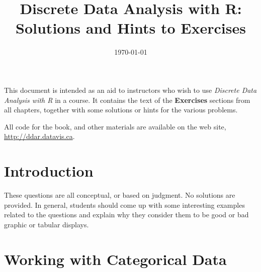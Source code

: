 \documentclass[10pt]{report}\usepackage[]{graphicx}\usepackage[]{color}
\title{\sffamily Discrete Data Analysis with R: \\ Solutions and Hints to Exercises}
\date{\today}
\begin{document}
\maketitle



This document is intended as an aid to instructors who wish to use
\emph{Discrete Data Analysis with R} in a course.  It contains the text
of the \textbf{Exercises} sections from all chapters, together with 
some solutions or hints for the various problems.

All \R code for the book, and other materials are available on the web site,
\url{http://ddar.datavis.ca}.

\chapter{Introduction}\label{ch:intro}
These questions are all conceptual, or based on judgment.  No solutions are provided.
In general, students should come up with some interesting examples related to the questions
and explain why they consider them to be good or bad graphic or tabular displays.




\chapter{Working with Categorical Data}\label{ch:working}
\end{document}

